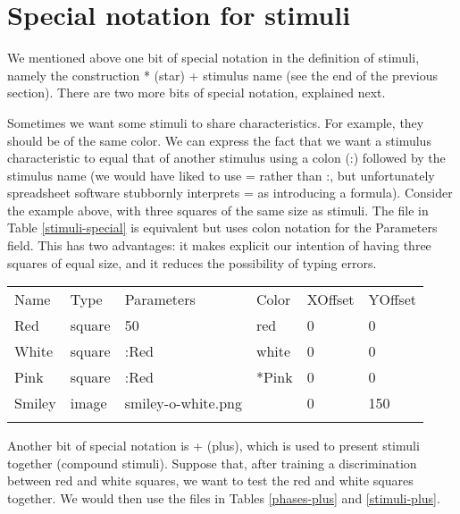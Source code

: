 \documentclass[11pt,]{article}
\renewcommand{\medskip}{}
\begin{document}
\section{Special notation for stimuli}

We mentioned above one bit of special notation in the definition of
stimuli, namely the construction * (star) + stimulus name (see the end
of the previous section). There are two more bits of special notation,
explained next.

Sometimes we want some stimuli to share characteristics. For example,
they should be of the same color. We can express the fact that we want a
stimulus characteristic to equal that of another stimulus using a colon
(:) followed by the stimulus name (we would have liked to use = rather
than :, but unfortunately spreadsheet software stubbornly interprets =
as introducing a formula). Consider the example above, with three
squares of the same size as stimuli. The file in Table
\ref{stimuli-special} is equivalent but uses colon notation for the
Parameters field. This has two advantages: it makes explicit our
intention of having three squares of equal size, and it reduces the
possibility of typing errors.

\begin{table*}[t]\begin{center}\small\begin{tabular}{@{}llllll@{}}
\hline\noalign{\medskip}
Name & Type & Parameters & Color & XOffset & YOffset
\\\noalign{\medskip}
\hline\noalign{\medskip}
Red & square & 50 & red & 0 & 0
\\\noalign{\medskip}
White & square & :Red & white & 0 & 0
\\\noalign{\medskip}
Pink & square & :Red & *Pink & 0 & 0
\\\noalign{\medskip}
Smiley & image & smiley-o-white.png & & 0 & 150
\\\noalign{\medskip}
\hline
\noalign{\medskip}
\end{tabular}\caption{A \texttt{Stimuli.csv} file demonstrating the * and : special
notations for stimuli. \label{stimuli-special}}
\end{center}\end{table*}

Another bit of special notation is + (plus), which is used to present
stimuli together (compound stimuli). Suppose that, after training a
discrimination between red and white squares, we want to test the red
and white squares together. We would then use the files in Tables
\ref{phases-plus} and \ref{stimuli-plus}.
\end{document}
